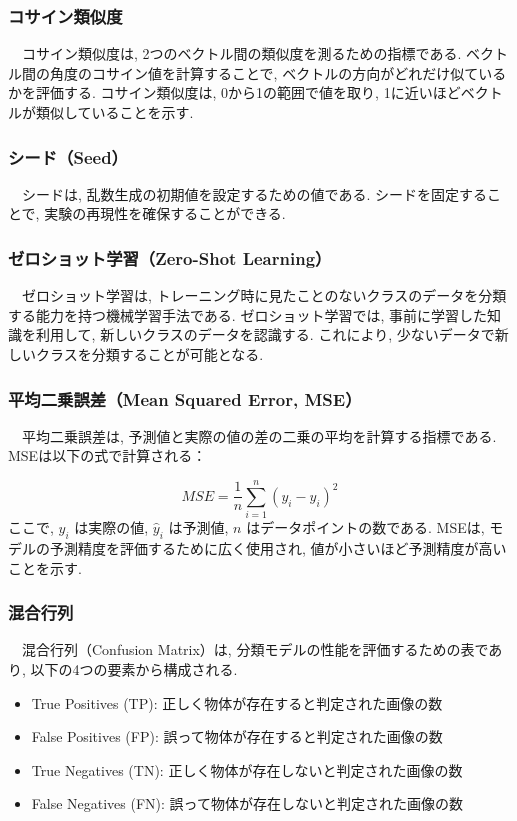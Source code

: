\documentclass[a4paper, 12pt]{report}
\begin{document}
\subsubsection{コサイン類似度}
　コサイン類似度は, 2つのベクトル間の類似度を測るための指標である. ベクトル間の角度のコサイン値を計算することで, ベクトルの方向がどれだけ似ているかを評価する. コサイン類似度は, 0から1の範囲で値を取り, 1に近いほどベクトルが類似していることを示す. 

\subsubsection{シード（Seed）}
　シードは, 乱数生成の初期値を設定するための値である. シードを固定することで, 実験の再現性を確保することができる. 

\subsubsection{ゼロショット学習（Zero-Shot Learning）}
　ゼロショット学習は, トレーニング時に見たことのないクラスのデータを分類する能力を持つ機械学習手法である. ゼロショット学習では, 事前に学習した知識を利用して, 新しいクラスのデータを認識する. これにより, 少ないデータで新しいクラスを分類することが可能となる. 

\subsubsection{平均二乗誤差（Mean Squared Error, MSE）}
　平均二乗誤差は, 予測値と実際の値の差の二乗の平均を計算する指標である. MSEは以下の式で計算される：

\[
MSE = \frac{1}{n} \sum_{i=1}^{n} (y_i - \hat{y}_i)^2
\]ここで, \( y_i \) は実際の値, \( \hat{y}_i \) は予測値, \( n \) はデータポイントの数である. MSEは, モデルの予測精度を評価するために広く使用され, 値が小さいほど予測精度が高いことを示す. 

\subsubsection{混合行列}
　混合行列（Confusion Matrix）は, 分類モデルの性能を評価するための表であり, 以下の4つの要素から構成される. 
\begin{itemize}
    \item True Positives (TP): 正しく物体が存在すると判定された画像の数
    \item False Positives (FP): 誤って物体が存在すると判定された画像の数
    \item True Negatives (TN): 正しく物体が存在しないと判定された画像の数
    \item False Negatives (FN): 誤って物体が存在しないと判定された画像の数
\end{itemize}
\end{document}
